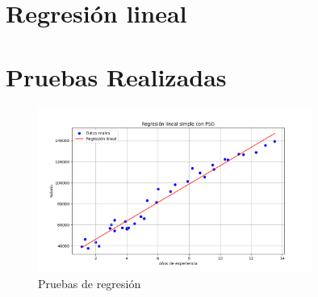 \documentclass{report}
\begin{document}
    \section{Regresión lineal}
    

    \section{Pruebas Realizadas}
    \begin{figure}[H]
        \centering
        \includegraphics[width=0.8\textwidth]{PruebasRegresion.png}
        \caption{Pruebas de regresión}
        \label{fig:pruebas}
    \end{figure}
\end{document}
